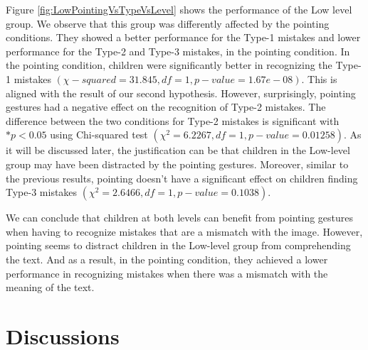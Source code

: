 \documentclass{sigchi}
\begin{document}
Figure \ref{fig:LowPointingVsTypeVsLevel} shows the performance of the Low level group.
We observe that this group was differently affected by the pointing conditions. 
They showed a better performance for the Type-1 mistakes and lower performance for the Type-2 and Type-3 mistakes, in the pointing condition. 
In the pointing condition, children were significantly better in recognizing the Type-1 mistakes $(\chi-squared = 31.845, df = 1, p-value = 1.67e-08)$. 
This is aligned with the result of our second hypothesis.
However, surprisingly, pointing gestures had a negative effect on the recognition of Type-2 mistakes. 
The difference between the two conditions for Type-2 mistakes is significant with $*p<0.05$ using Chi-squared test $(\chi^2 = 6.2267, df = 1, p-value = 0.01258)$. As it will be discussed later, the justification can be that children in the Low-level group may have been distracted by the pointing gestures.
Moreover, similar to the previous results, pointing doesn't have a significant effect on children finding Type-3 mistakes $(\chi^2 = 2.6466, df = 1, p-value = 0.1038)$.

We can conclude that children at both levels can benefit from pointing gestures when having to recognize mistakes that are a mismatch with the image.
However, pointing seems to distract children in the Low-level group from comprehending the text.
And as a result, in the pointing condition, they achieved a lower performance in recognizing mistakes when there was a mismatch with the meaning of the text.





\section{Discussions}
\end{document}
